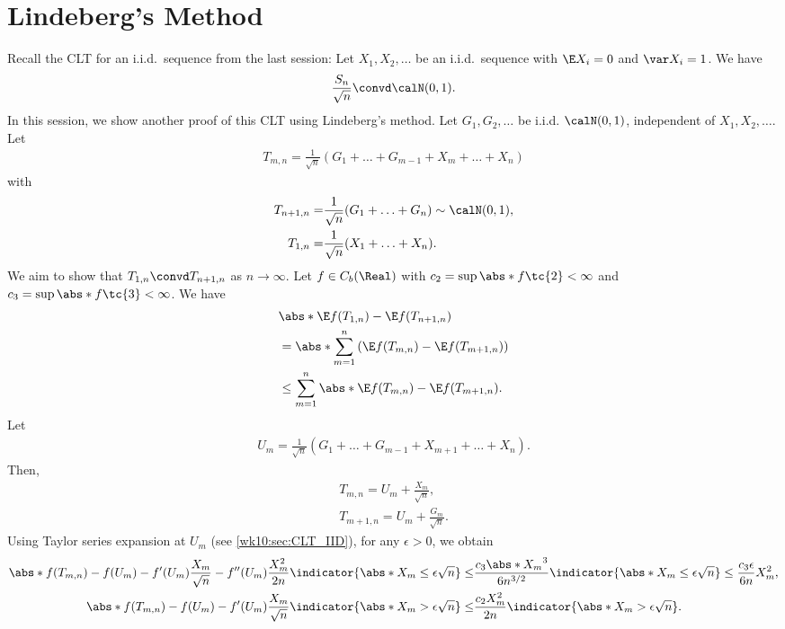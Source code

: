 \documentclass[../aipt.tex]{subfiles}
\begin{document}

\section{Lindeberg's Method}
Recall the CLT for an i.i.d.\ sequence from the last session: Let $X_1, X_2, \ldots$ be an i.i.d.\ sequence with $\E X_i = 0$ and $\var X_i = 1$. We have
\begin{align*}
\frac{S_n}{\sqrt{n}} \convd \calN (0, 1).
\end{align*}
In this session, we show another proof of this CLT using Lindeberg's method. Let $G_1, G_2, \ldots$ be i.i.d. $\calN(0, 1)$, independent of $X_1,X_2,\ldots$. Let
\begin{align*}
T_{m,n} = \frac{1}{\sqrt{n}} (G_1 + \ldots + G_{m-1} + X_m + \ldots + X_n)
\end{align*}
with
\begin{align*}
T_{n+1,n} =& \frac{1}{\sqrt{n}} (G_1 + \ldots + G_n) \sim \calN (0, 1), \\
T_{1,n} =& \frac{1}{\sqrt{n}} (X_1 + \ldots + X_n).
\end{align*}
We aim to show that $T_{1,n} \convd T_{n+1,n}$ as $n \to \infty$. Let $f \in C_b(\Real)$ with $c_2 = \sup \abs*{f\tc{2}} < \infty$ and $c_3 = \sup \abs*{f\tc{3}} < \infty$. We have
\begin{align*}
&\abs*{\E f(T_{1,n}) - \E f(T_{n+1,n})} \\
&= \abs*{ \sum_{m=1}^{n} \left( \E f(T_{m,n}) - \E f(T_{m+1,n}) \right)} \\
&\leq \sum_{m=1}^{n} \abs*{ \E f(T_{m,n}) - \E f(T_{m+1,n}) }.
\end{align*}
Let
\begin{align*}
U_m = \frac{1}{\sqrt{n}} \left(G_1 + \ldots + G_{m-1} + X_{m+1} + \ldots + X_n\right).
\end{align*}
Then,
\begin{align*}
T_{m,n} = U_m + \frac{X_m}{\sqrt{n}}, \\
T_{m+1,n} = U_m + \frac{G_m}{\sqrt{n}}.
\end{align*}
Using Taylor series expansion at $U_m$ (see \cref{wk10:sec:CLT_IID}), for any $\epsilon>0$, we obtain
\begin{align*}
\abs*{f(T_{m,n}) - f(U_m) - f'(U_m)\frac{X_m}{\sqrt{n}} - f''(U_m)\frac{X_m^2}{2n}} \indicator{\abs*{X_m} \leq \epsilon \sqrt{n}} 
\leq&
\frac{c_3\abs*{X_m}^3}{6n^{3/2}} \indicator{\abs*{X_m} \leq \epsilon \sqrt{n}}
\leq
\frac{c_3\epsilon}{6n} X_m^2, \\
%
\abs*{f(T_{m,n}) - f(U_m) - f'(U_m)\frac{X_m}{\sqrt{n}} } \indicator{\abs*{X_m} > \epsilon \sqrt{n}}
\leq&
\frac{c_2 X_m^2}{2n} \indicator{\abs*{X_m} > \epsilon \sqrt{n}}.
\end{align*}
\end{document}
